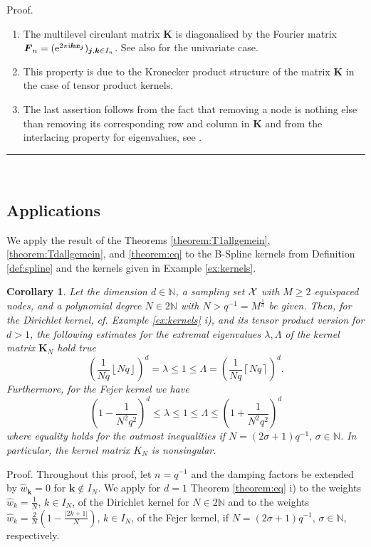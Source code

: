 \documentclass[11pt,a4paper,bibtotoc]{scrartcl}
\def\N{\mathbb{N}}
\def\ti{\mbox{\scriptsize{\rm i}}}
\newcommand{\eip}[1]{{\rm e}^{ 2\pi{\ti} #1}}
\newcommand{\zb}[1]{\ensuremath{\boldsymbol{#1}}}
\newcommand{\indexset}{{I_N}}
\renewcommand{\Box}{\hspace*{0ex} \hfill \rule{1.5ex}{1.5ex} \\ \goodbreak}
\newtheorem{corollary}[theorem]{Corollary}
\newenvironment{Corollary}{\goodbreak \begin{corollary}\rm}{\end{corollary}}
\numberwithin{equation}{section}
\numberwithin{table}{section}
\numberwithin{figure}{section}
\begin{document}
Proof.
\begin{enumerate}
\item The multilevel circulant matrix $\zb K$ is diagonalised by the Fourier
  matrix $\zb F_n=(\eip{\zb k\zb x_{\zb j}})_{\zb j,\zb k\in I_n}$.
  See also \cite[Cor. 3.10, Thm. 3.11]{NaSiWa98} for the univariate case.
\item This property is due to the Kronecker product structure of the matrix
  $\zb K$ in the case of tensor product kernels.
\item The last assertion follows from the fact that removing a node is nothing
  else than removing its corresponding row and column in $\zb K$ and from the
  interlacing property for eigenvalues, see \cite[pp. 185]{HoJo}.
\end{enumerate}
\Box

\subsection*{Applications} \label{sect:appl}
We apply the result of the Theorems \ref{theorem:T1allgemein},
\ref{theorem:Tdallgemein}, and \ref{theorem:eq} to the B-Spline kernels from
Definition \ref{def:spline} and the kernels given in Example
\ref{ex:kernels}.
\begin{Corollary}  \label{cor:eq}
  Let the dimension $d\in\N$, a sampling set $\cal X$ with $M\ge 2$ equispaced
  nodes, and a polynomial degree $N\in 2\mathbb{N}$ with
  $N>q^{-1}=M^{\frac{1}{d}}$ be given.
  Then, for the Dirichlet kernel, cf. Example \ref{ex:kernels} i),
  and its tensor product version for $d>1$, the following estimates for the
  extremal eigenvalues $\lambda,\Lambda$ of the kernel matrix $\zb K_N$ hold
  true
  \begin{equation*}
    \left(\frac{1}{Nq}\left\lfloor Nq \right\rfloor\right)^d
    = \lambda \le 1 \le \Lambda =
    \left(\frac{1}{Nq}\left\lceil{Nq}\right\rceil\right)^d.
  \end{equation*}
  Furthermore, for the Fejer kernel we have
  \begin{equation*}
    \left(1- \frac{1}{ N^2q^{2}}\right)^d
    \le \lambda \le 1 \le \Lambda \le
    \left(1+ \frac{1}{ N^2q^{2}}\right)^d
  \end{equation*}
  where equality holds for the outmost inequalities if
  $N=\left(2\sigma+1\right)q^{-1},\,\sigma\in\mathbb{N}$.
  In particular, the kernel matrix $K_N$ is nonsingular.
\end{Corollary}

Proof. Throughout this proof, let $n=q^{-1}$ and the damping factors be
extended by $\hat w_{\zb k}=0$ for $\zb k \notin \indexset$.
We apply for $d=1$ Theorem \ref{theorem:eq} i) to the weights
$\hat w_k= \frac{1}{N}$, $k \in I_N$, of the Dirichlet kernel for $N\in 2\N$
and to the weights $\hat w_k= \frac{2}{N}(1-\frac{|2k+1|}{N})$, $k \in I_N$,
of the Fejer kernel, if $N=\left(2\sigma+1\right)q^{-1},\,\sigma\in
\mathbb{N}$, respectively.
\end{document}
